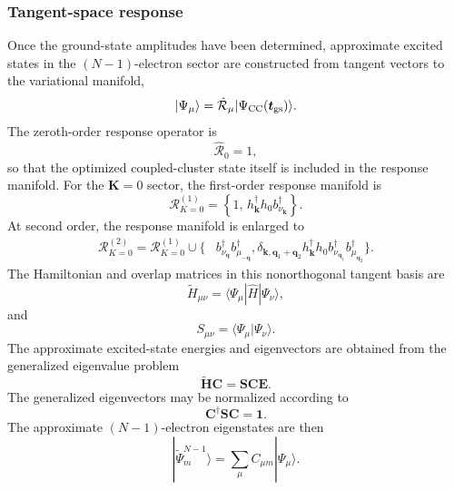 \subsubsection{Tangent-space response}
Once the ground-state amplitudes have been
determined, approximate excited states in the $(N-1)$-electron sector
are constructed from tangent vectors to the variational manifold,
\begin{equation}
    |\Psi_{\mu}\rangle
    =
    \hat{\mathcal{R}}_{\mu}
    |\Psi_{\rm CC}(\bm{t}_{\rm gs})\rangle.
\end{equation}
The zeroth-order response operator is
\begin{equation}
    \hat{\mathcal{R}}_0=1,
\end{equation}
so that the optimized coupled-cluster state itself is included in the
response manifold.
For the $\bm{K}=0$ sector, the first-order response manifold is
\begin{equation}
    {
    \mathcal{R}_{K=0}^{(1)}
    =
    \left\{
    1,\,
    h_{\bm{k}}^{\dagger}
    h_0
    b_{\nu_{\bm{k}}}^{\dagger}
    \right\}.
    }
\end{equation}
%
At second order, the response manifold is enlarged to
\begin{align}
    \mathcal{R}_{K=0}^{(2)}
    =
    \mathcal{R}_{K=0}^{(1)}
    \cup
    \Bigg\{
    &
    b_{\nu_{\bm{q}}}^{\dagger}
    b_{\mu_{-\bm{q}}}^{\dagger},
    \delta_{\bm{k},\bm{q}_1+\bm{q}_2}
    h_{\bm{k}}^{\dagger}
    h_0
    b_{\nu_{\bm{q}_1}}^{\dagger}
    b_{\mu_{\bm{q}_2}}^{\dagger}
    \Bigg\}.
\end{align}
%
The Hamiltonian and overlap matrices in this nonorthogonal tangent
basis are
\begin{equation}
    \widetilde{H}_{\mu\nu}
    =
    \langle\Psi_{\mu}|
    \hat{H}
    |\Psi_{\nu}\rangle,
\end{equation}
and
\begin{equation}
    S_{\mu\nu}
    =
    \langle\Psi_{\mu}|\Psi_{\nu}\rangle.
\end{equation}
The approximate excited-state energies and eigenvectors are obtained
from the generalized eigenvalue problem
\begin{equation}
    {
    \widetilde{\bm{H}}\bm{C}
    =
    \bm{S}\bm{C}\bm{E}.
    }
\end{equation}
The generalized eigenvectors may be normalized according to
\begin{equation}
    \bm{C}^{\dagger}\bm{S}\bm{C}
    =
    \bm{1}.
\end{equation}
The approximate $(N-1)$-electron eigenstates are then
\begin{equation}
    |\widetilde{\Psi}_m^{N-1}\rangle
    =
    \sum_{\mu}
    C_{\mu m}
    |\Psi_{\mu}\rangle.
\end{equation}
